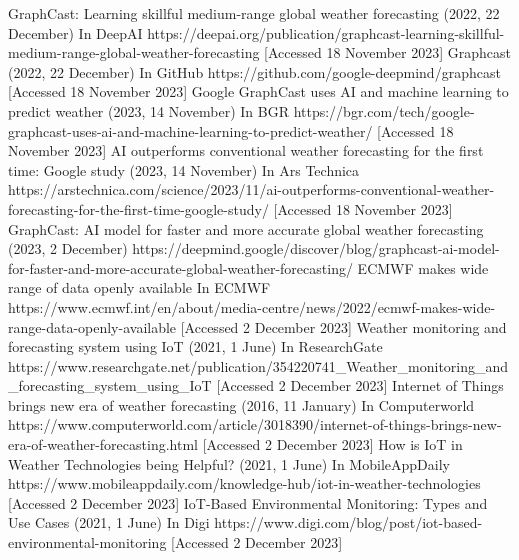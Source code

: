 \documentclass[../paper.tex]{subfiles}
\begin{document}
\begin{thebibliography}{00}
     GraphCast: Learning skillful medium-range global weather forecasting (2022, 22 December) In DeepAI https://deepai.org/publication/graphcast-learning-skillful-medium-range-global-weather-forecasting [Accessed 18 November 2023]
     Graphcast (2022, 22 December) In GitHub https://github.com/google-deepmind/graphcast [Accessed 18 November 2023]
     Google GraphCast uses AI and machine learning to predict weather (2023, 14 November) In BGR https://bgr.com/tech/google-graphcast-uses-ai-and-machine-learning-to-predict-weather/ [Accessed 18 November 2023]
     AI outperforms conventional weather forecasting for the first time: Google study (2023, 14 November) In Ars Technica https://arstechnica.com/science/2023/11/ai-outperforms-conventional-weather-forecasting-for-the-first-time-google-study/ [Accessed 18 November 2023]
     GraphCast: AI model for faster and more accurate global weather forecasting (2023, 2 December) https://deepmind.google/discover/blog/graphcast-ai-model-for-faster-and-more-accurate-global-weather-forecasting/
     ECMWF makes wide range of data openly available In ECMWF https://www.ecmwf.int/en/about/media-centre/news/2022/ecmwf-makes-wide-range-data-openly-available [Accessed 2 December 2023]
     Weather monitoring and forecasting system using IoT (2021, 1 June) In ResearchGate https://www.researchgate.net/publication/354220741\_Weather\_monitoring\_and\_forecasting\_system\_using\_IoT [Accessed 2 December 2023]
     Internet of Things brings new era of weather forecasting (2016, 11 January) In Computerworld https://www.computerworld.com/article/3018390/internet-of-things-brings-new-era-of-weather-forecasting.html [Accessed 2 December 2023]
     How is IoT in Weather Technologies being Helpful?
    (2021, 1 June) In MobileAppDaily https://www.mobileappdaily.com/knowledge-hub/iot-in-weather-technologies [Accessed 2 December 2023]
     IoT-Based Environmental Monitoring: Types and Use Cases (2021, 1 June) In Digi https://www.digi.com/blog/post/iot-based-environmental-monitoring [Accessed 2 December 2023]
\end{thebibliography}
\end{document}
